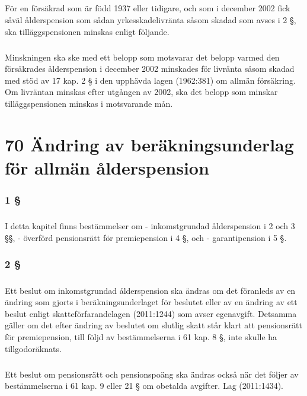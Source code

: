 \documentclass[a4paper,notitlepage,openany,10pt]{book}
\begin{document}
\paragraph*{}
För en försäkrad som är född 1937 eller tidigare, och som i december 2002 fick såväl ålderspension som sådan yrkesskadelivränta såsom skadad som avses i 2 §, ska tilläggspensionen minskas enligt följande.
\paragraph*{}
Minskningen ska ske med ett belopp som motsvarar det belopp varmed den försäkrades ålderspension i december 2002 minskades för livränta såsom skadad med stöd av 17 kap. 2 § i den upphävda lagen (1962:381) om allmän försäkring. Om livräntan minskas efter utgången av 2002, ska det belopp som minskar tilläggspensionen minskas i motsvarande mån.
\chapter*{70 Ändring av beräkningsunderlag för allmän ålderspension}
\subsection*{1 §}
\paragraph*{}
I detta kapitel finns bestämmelser om
\newline - inkomstgrundad ålderspension i 2 och 3 §§,
\newline - överförd pensionsrätt för premiepension i 4 §, och
\newline - garantipension i 5 §.
\subsection*{2 §}
\paragraph*{}
Ett beslut om inkomstgrundad ålderspension ska ändras om det föranleds av en ändring som gjorts i beräkningsunderlaget för beslutet eller av en ändring av ett beslut enligt skatteförfarandelagen (2011:1244) som avser egenavgift.
Detsamma gäller om det efter ändring av beslutet om slutlig skatt står klart att pensionsrätt för premiepension, till följd av bestämmelserna i 61 kap. 8 §, inte skulle ha tillgodoräknats.
\paragraph*{}
Ett beslut om pensionsrätt och pensionspoäng ska ändras också när det följer av bestämmelserna i 61 kap. 9 eller 21 § om obetalda avgifter.
Lag (2011:1434).
\end{document}

